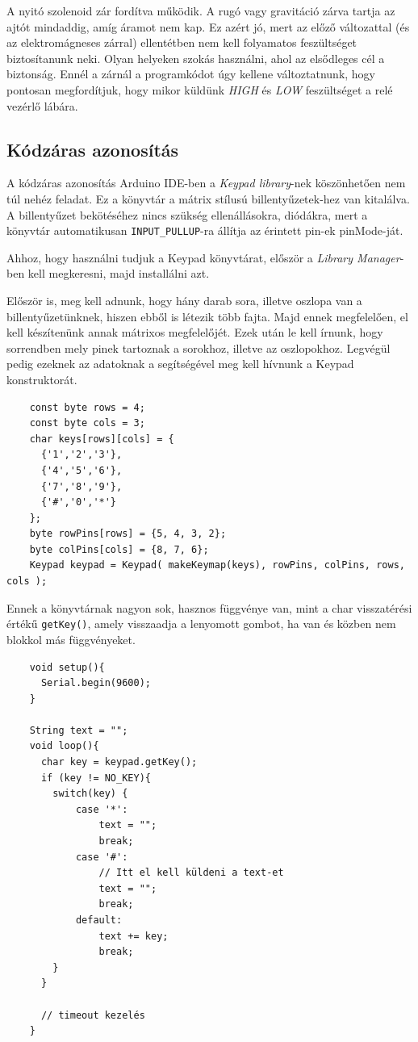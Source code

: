 \documentclass[
]{thesis-ekf}
\theoremstyle{definition}
\theoremstyle{remark}
\begin{document}
A nyitó szolenoid zár fordítva működik. A rugó vagy gravitáció zárva tartja az ajtót mindaddig, amíg áramot nem kap. Ez azért jó, mert az előző változattal (és az elektromágneses zárral) ellentétben nem kell folyamatos feszültséget biztosítanunk neki. Olyan helyeken szokás használni, ahol az elsődleges cél a biztonság. \cite{solenoid} Ennél a zárnál a programkódot úgy kellene változtatnunk, hogy pontosan megfordítjuk, hogy mikor küldünk \emph{HIGH} és \emph{LOW} feszültséget a relé vezérlő lábára. 

\subsection*{Kódzáras azonosítás}
A kódzáras azonosítás Arduino IDE-ben a \emph{Keypad library}-nek köszönhetően nem túl nehéz feladat. Ez a könyvtár a mátrix stílusú billentyűzetek-hez van kitalálva. A billentyűzet bekötéséhez nincs szükség ellenállásokra, diódákra, mert a könyvtár automatikusan \texttt{INPUT\_PULLUP}-ra állítja az érintett pin-ek pinMode-ját. 

Ahhoz, hogy használni tudjuk a Keypad könyvtárat, először a \emph{Library Manager}-ben kell megkeresni, majd installálni azt.

Először is, meg kell adnunk, hogy hány darab sora, illetve oszlopa van a billentyűzetünknek, hiszen ebből is létezik több fajta. Majd ennek megfelelően, el kell készítenünk annak mátrixos megfelelőjét. Ezek után le kell írnunk, hogy sorrendben mely pinek tartoznak a sorokhoz, illetve az oszlopokhoz. Legvégül pedig ezeknek az adatoknak a segítségével meg kell hívnunk a Keypad konstruktorát.

\begin{lstlisting}
    const byte rows = 4;
    const byte cols = 3;
    char keys[rows][cols] = {
      {'1','2','3'},
      {'4','5','6'},
      {'7','8','9'},
      {'#','0','*'}
    };
    byte rowPins[rows] = {5, 4, 3, 2};
    byte colPins[cols] = {8, 7, 6};
    Keypad keypad = Keypad( makeKeymap(keys), rowPins, colPins, rows, cols );
\end{lstlisting}

Ennek a könyvtárnak nagyon sok, hasznos függvénye van, mint a char visszatérési értékű \texttt{getKey()}, amely visszaadja a lenyomott gombot, ha van és közben nem blokkol más függvényeket.

\begin{lstlisting}
    void setup(){
      Serial.begin(9600);
    }

    String text = "";
    void loop(){
      char key = keypad.getKey();
      if (key != NO_KEY){ 
        switch(key) {
            case '*':
                text = "";
                break;
            case '#':
                // Itt el kell küldeni a text-et
                text = "";
                break;
            default:
                text += key;
                break;
        }
      }

      // timeout kezelés
    }
\end{lstlisting}
\end{document}
